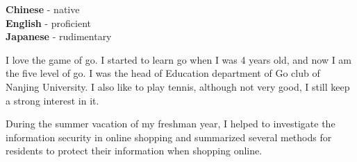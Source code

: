 \documentclass[9pt]{developercv} %
\begin{document}

\begin{minipage}[t]{0.3\textwidth}
    \vspace{-\baselineskip} %


    \textbf{Chinese} - native\\
    \textbf{English} - proficient\\
    \textbf{Japanese} - rudimentary
\end{minipage}
\hfill
\begin{minipage}[t]{0.3\textwidth}
    \vspace{-\baselineskip} %


    I love the game of go. I started to learn go when I was 4 years old, and now I am the five level of go. I was the head of Education department of Go club of Nanjing University. I also like to play tennis, although not very good, I still keep a strong interest in it.
\end{minipage}
\hfill
\begin{minipage}[t]{0.3\textwidth}
    \vspace{-\baselineskip} %


    During the summer vacation of my freshman year, I helped to investigate the information security in online shopping and summarized several methods for residents to protect their information when shopping online.
\end{minipage}

\end{document}
